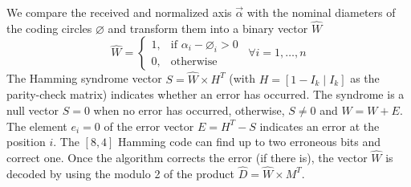 We compare the received and normalized axis $\vec{\alpha}$ with the nominal diameters of the coding circles $\varnothing$ and transform them into a binary vector $\widehat{W}$
\begin{equation}
\widehat{W}=
\begin{cases}
  1, & \text{if } \alpha_{i}-\diameter_{i} > 0 \\
  0, & \text{otherwise}
\end{cases} \enspace \forall i=1,\ldots, n
\end{equation}
The Hamming syndrome vector $S=\widehat{W}\times H^{T}$ (with $H=[1-I_{k}\mid I_{k}]$ as the parity-check matrix) indicates whether an error has occurred. The syndrome is a null vector $S=0$ when no error has occurred, otherwise, $S\neq 0$ and $\widehat{W}=W+E$. The element $e_{i}=0$ of the error vector $E=H^{T}-S$ indicates an error at the position $i$. The $[8,4]$ Hamming code can find up to two erroneous bits and correct one. Once the algorithm corrects the error (if there is), the vector $\widehat{W}$ is decoded by using the modulo 2 of the product $\widehat{D}=\widehat{W}\times M^{T}$. 

